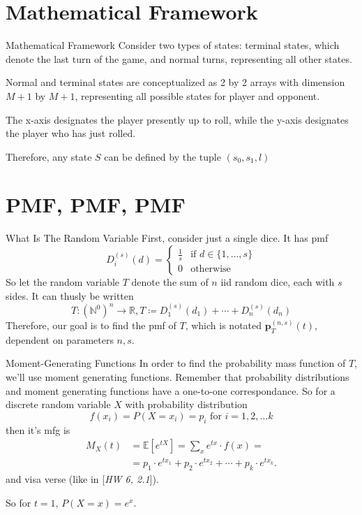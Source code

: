 \documentclass{beamer}
\begin{document}
\section{Mathematical Framework}
\begin{frame}{Mathematical Framework}
    Consider two types of states: terminal states, which denote the last turn of the game, and normal turns, representing all other states. 

    Normal and terminal states are conceptualized as 2 by 2 arrays with dimension $M+1$ by $M+1$, representing all possible states for player and opponent.
    
    The x-axis designates the player presently up to roll, while the y-axis designates the player who has just rolled.

    Therefore, any state $S$ can be defined by the tuple $(s_0, s_1, l)$
\end{frame}

\section{PMF, PMF, PMF}
\begin{frame}{What Is The Random Variable}
    First, consider just a single dice. It has pmf
    $$
    D_{i}^{(s)}(d) = \begin{cases}
        \frac{1}{s} & \text{if } d \in \{1, \ldots, s \} \\
        0 & \text{otherwise}
    \end{cases}
    $$
    So let the random variable $T$ denote the sum of $n$ iid random dice, each with $s$ sides. It can thusly be written
    $$ 
    T: \left(\mathbb{N}^{0}\right)^n \to \mathbb{R}, T \coloneqq D_{1}^{(s)}(d_1) + \cdots + D_{n}^{(s)}(d_n) 
    $$
    Therefore, our goal is to find the pmf of $T$, which is notated $\textbf{p}_{T}^{(n, s)}(t)$, dependent on parameters $n, s$. 
\end{frame}

\begin{frame}{Moment-Generating Functions}
    In order to find the probability mass function of $T$, we'll use moment generating functions. Remember that probability distributions and moment generating functions have a one-to-one correspondance. So for a discrete random variable $X$ with probability distribution
    $$ 
    f(x_i) = P(X = x_i) = p_i \text{ for } i = 1, 2, \ldots k 
    $$
    then it's mfg is
    \begin{align*}
        M_X(t) &= \mathbb{E}[e^{tX}] = \sum_{x} e^{tx} \cdot f(x) =  \\ 
        &= p_1 \cdot e^{tx_1} + p_2 \cdot e^{tx_2} + \cdots + p_k \cdot e^{tx_k}.
    \end{align*}
    and visa verse (like in [\textit{HW 6, 2.1}]).

    So for $t = 1$, $P(X = x) = e^x$. 
\end{frame}
\end{document}
